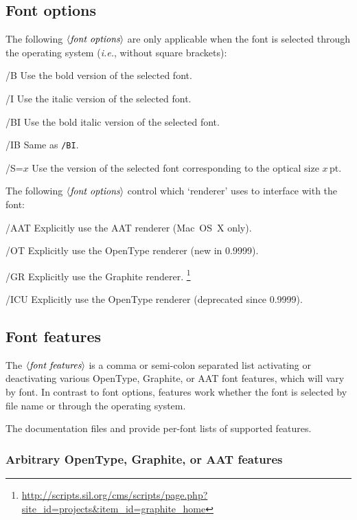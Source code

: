 \documentclass[12pt]{article}
\newcommand\xetex  {\hologo{XeTeX}\xspace}
\newenvironment{optdesc}
  {\begin{description}[font=\ttfamily,style=nextline,leftmargin=1.5cm]}
  {\end{description}}
\newcommand\xarg[1]{$\langle\hbox{\rmfamily\itshape #1}\rangle$}
\let\latin\textit
\def\ie{\latin{i.e.}}
\begin{document}
\subsection{Font options}

The following \xarg{font options} are only applicable when the font is selected
through the operating system (\ie, without square brackets):
\begin{optdesc}
\item[/B] Use the bold version of the selected font.
\item[/I] Use the italic version of the selected font.
\item[/BI] Use the bold italic version of the selected font.
\item[/IB] Same as \texttt{/BI}.
\item[/S=$x$] Use the version of the selected font corresponding to the
optical size $x$\,pt.
\end{optdesc}

The following \xarg{font options} control which `renderer' \xetex uses to interface with the font:
\begin{optdesc}
\item[/AAT] Explicitly use the AAT renderer (Mac~OS~X only).
\item[/OT] Explicitly use the OpenType renderer (new in 0.9999).
\item[/GR] Explicitly use the Graphite renderer.%
           \footnote{\url{http://scripts.sil.org/cms/scripts/page.php?site_id=projects&item_id=graphite_home}}
\item[/ICU] Explicitly use the OpenType renderer (deprecated since 0.9999).
\end{optdesc}


\subsection{Font features}

The \xarg{font features} is a comma or semi-colon separated list
activating or deactivating various OpenType, Graphite, or AAT font
features, which will vary by font.  In contrast to font options,
features work whether the font is selected by file name or through the
operating system.

The \xetex documentation files  and
 provide per-font lists of supported features.

\subsubsection{Arbitrary OpenType, Graphite, or AAT features}
\end{document}
